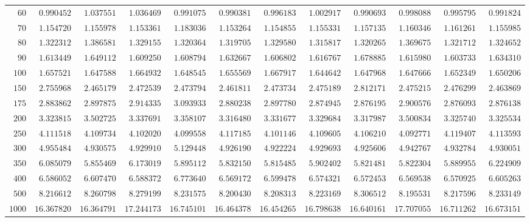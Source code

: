 \begin{sidewaystable}
\begin{tabular}{r|rrrrrrrrrrr}
$60$ & $0.990452$ & $1.037551$ & $1.036469$ & $0.991075$ & $0.990381$ & $0.996183$ & $1.002917$ & $0.990693$ & $0.998088$ & $0.995795$ & $0.991824$ \\
$70$ & $1.154720$ & $1.155978$ & $1.153361$ & $1.183036$ & $1.153264$ & $1.154855$ & $1.155331$ & $1.157135$ & $1.160346$ & $1.161261$ & $1.155985$ \\
$80$ & $1.322312$ & $1.386581$ & $1.329155$ & $1.320364$ & $1.319705$ & $1.329580$ & $1.315817$ & $1.320265$ & $1.369675$ & $1.321712$ & $1.324652$ \\
$90$ & $1.613449$ & $1.649112$ & $1.609250$ & $1.608794$ & $1.632667$ & $1.606802$ & $1.616767$ & $1.678885$ & $1.615980$ & $1.603733$ & $1.634310$ \\
$100$ & $1.657521$ & $1.647588$ & $1.664932$ & $1.648545$ & $1.655569$ & $1.667917$ & $1.644642$ & $1.647968$ & $1.647666$ & $1.652349$ & $1.650206$ \\
$150$ & $2.755968$ & $2.465179$ & $2.472539$ & $2.473794$ & $2.461811$ & $2.473734$ & $2.475189$ & $2.812171$ & $2.475215$ & $2.476299$ & $2.463869$ \\
$175$ & $2.883862$ & $2.897875$ & $2.914335$ & $3.093933$ & $2.880238$ & $2.897780$ & $2.874945$ & $2.876195$ & $2.900576$ & $2.876093$ & $2.876138$ \\
$200$ & $3.323815$ & $3.502725$ & $3.337691$ & $3.358107$ & $3.316480$ & $3.331677$ & $3.329684$ & $3.317987$ & $3.500834$ & $3.325740$ & $3.325534$ \\
$250$ & $4.111518$ & $4.109734$ & $4.102020$ & $4.099558$ & $4.117185$ & $4.101146$ & $4.109605$ & $4.106210$ & $4.092771$ & $4.119407$ & $4.113593$ \\
$300$ & $4.955484$ & $4.930575$ & $4.929910$ & $5.129448$ & $4.926190$ & $4.922224$ & $4.929693$ & $4.925606$ & $4.942767$ & $4.932784$ & $4.930051$ \\
$350$ & $6.085079$ & $5.855469$ & $6.173019$ & $5.895112$ & $5.832150$ & $5.815485$ & $5.902402$ & $5.821481$ & $5.822304$ & $5.889955$ & $6.224909$ \\
$400$ & $6.586052$ & $6.607470$ & $6.588372$ & $6.773640$ & $6.569172$ & $6.599478$ & $6.574321$ & $6.572453$ & $6.569538$ & $6.570925$ & $6.605263$ \\
$500$ & $8.216612$ & $8.260798$ & $8.279199$ & $8.231575$ & $8.200430$ & $8.208313$ & $8.223169$ & $8.306512$ & $8.195531$ & $8.217596$ & $8.233149$ \\
$1000$ & $16.367820$ & $16.364791$ & $17.244173$ & $16.745101$ & $16.464378$ & $16.454265$ & $16.798638$ & $16.640161$ & $17.707055$ & $16.711262$ & $16.673151$ \\
\hline
\end{tabular}
\end{sidewaystable}
 

